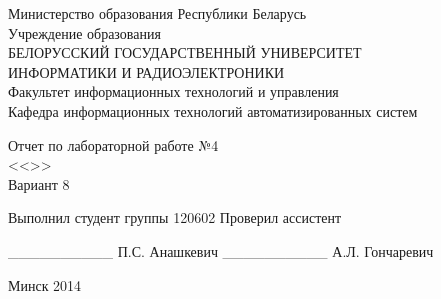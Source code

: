 
\thispagestyle{empty}
\setlength{\parindent}{0ex} %

\begin{center}
  Министерство образования Республики Беларусь \\
  \smallskip
  Учреждение образования \\
  БЕЛОРУССКИЙ ГОСУДАРСТВЕННЫЙ УНИВЕРСИТЕТ \\
  ИНФОРМАТИКИ И РАДИОЭЛЕКТРОНИКИ \\
  \smallskip
  Факультет информационных технологий и управления \\
  \smallskip
  Кафедра информационных технологий автоматизированных систем
\end{center}

\vspace{50mm}

\begin{center}
  Отчет по лабораторной работе №4 \\
  <<>> \\
  Вариант 8
\end{center}

\vspace{45mm}

\begin{minipage}{.55\linewidth}
  Выполнил студент группы 120602
  \smallskip
  Проверил ассистент
\end{minipage}
\hfill
\begin{minipage}{.4\linewidth}
  \begin{flushright}
    \_\_\_\_\_\_\_\_\_\_ П.С. Анашкевич
    \smallskip
    \_\_\_\_\_\_\_\_\_\_ А.Л. Гончаревич
  \end{flushright}
\end{minipage}

\vspace{60mm}
\begin{center}
  Минск 2014
\end{center}

\setlength{\parindent}{5ex} %